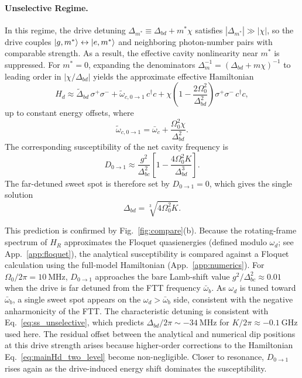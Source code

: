 \paragraph{Unselective Regime.}
In this regime, the drive detuning \(\Delta_{m^\ast}\equiv \Delta_{bd}+m^\ast\chi\) satisfies \( |\Delta_{m^\ast}|\gg|\chi| \), so the drive couples
\(|g,m^\ast\rangle\leftrightarrow|e,m^\ast\rangle\) and neighboring photon-number pairs with comparable strength.
As a result, the effective cavity nonlinearity near \(m^\ast\) is suppressed.
For \(m^\ast=0\), expanding the denominators
\(\Delta_m^{-1}=(\Delta_{bd}+m\chi)^{-1}\) to leading order in \(|\chi/\Delta_{bd}|\) yields the approximate effective Hamiltonian
\begin{equation}
\label{eq:Hd_far_detuned}
H_d \approx
\widetilde{\Delta}_{bd}\,\sigma^+\sigma^-
+\widetilde{\omega}_{c,0\rightarrow 1}\,c^\dagger c
+\chi\left(1-\frac{2\Omega_0^2}{\Delta_{bd}^2}\right)\sigma^+\sigma^-\,c^\dagger c ,
\end{equation}
up to constant energy offsets, where
\begin{equation}
\widetilde{\omega}_{c,0\rightarrow 1}=\bar{\omega}_c+\frac{\Omega_0^2\chi}{\Delta_{bd}^2}.
\end{equation}
The corresponding susceptibility of the net cavity frequency is
\begin{equation}
\label{eq:D01_unselective}
D_{0 \rightarrow 1}
\approx \frac{g^2}{\Delta_{bc}^2}\left[1-\frac{4\Omega_0^2K}{\Delta_{bd}^3}\right].
\end{equation}
The far-detuned sweet spot is therefore set by \(D_{0 \rightarrow 1}=0\), which gives the single solution
\begin{equation}
\label{eq:ss_unselective}
\Delta_{bd}=\sqrt[3]{4\Omega_0^2K}.
\end{equation}

This prediction is confirmed by Fig.~\ref{fig:compare}(b).
Because the rotating-frame spectrum of \(H_R\) approximates the Floquet quasienergies (defined modulo \(\omega_d\); see App.~\ref{app:floquet}), the analytical susceptibility is compared against a Floquet calculation using the full-model Hamiltonian (App.~\ref{app:numerics}).
For \(\Omega_0/2\pi=10~\mathrm{MHz}\), \(D_{0 \rightarrow 1}\) approaches the bare Lamb-shift value \(g^2/\Delta_{bc}^2\approx0.01\) when the drive is far detuned from the FTT frequency \(\bar{\omega}_b\).
As \(\omega_d\) is tuned toward \(\bar{\omega}_b\), a single sweet spot appears on the \(\omega_d>\bar{\omega}_b\) side, consistent with the negative anharmonicity of the FTT.
The characteristic detuning is consistent with Eq.~\eqref{eq:ss_unselective}, which predicts \(\Delta_{bd}/2\pi\sim -34~\mathrm{MHz}\) for \(K/2\pi\approx-0.1~\mathrm{GHz}\) used here.
The residual offset between the analytical and numerical dip positions at this drive strength arises because higher-order corrections to the Hamiltonian Eq.~\eqref{eq:mainHd_two_level} become non-negligible.
Closer to resonance, \(D_{0 \rightarrow 1}\) rises again as the drive-induced energy shift dominates the susceptibility.

